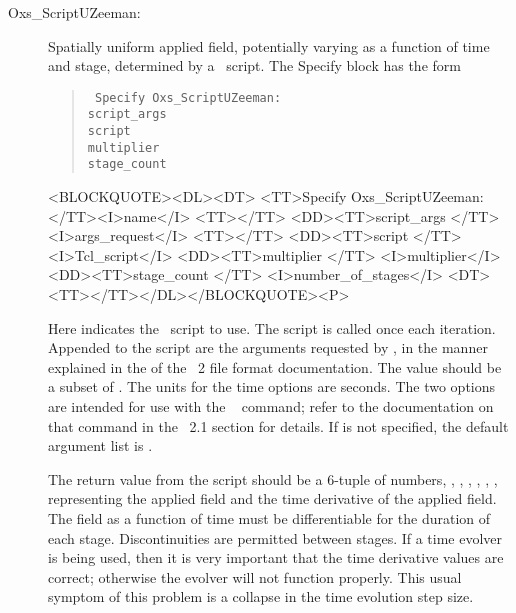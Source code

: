\begin{description}
\item[Oxs\_ScriptUZeeman:]
%
   Spatially uniform applied field,
   potentially varying as a function of time and stage, determined by a
   \Tcl\ script.  The Specify block has the form
      \begin{latexonly}
      \begin{quote}\tt
      Specify Oxs\_ScriptUZeeman: \ocb\\
       \bi script\_args \ocb{}\ccb\\
       \bi script \\
       \bi multiplier \\
       \bi stage\_count  \\
      \ccb
      \end{quote}
      \end{latexonly}
      \begin{rawhtml}
      <BLOCKQUOTE><DL><DT>
      <TT>Specify Oxs_ScriptUZeeman:</TT><I>name</I> <TT>{</TT>
      <DD><TT>script_args {</TT> <I>args_request</I> <TT>}</TT>
      <DD><TT>script </TT> <I>Tcl_script</I>
      <DD><TT>multiplier </TT> <I>multiplier</I>
      <DD><TT>stage_count </TT> <I>number_of_stages</I>
      <DT><TT>}</TT></DL></BLOCKQUOTE><P>
      \end{rawhtml}
   Here  indicates the \Tcl\ script to use.  The script
   is called once each iteration.  Appended to the script are the
   arguments requested by , in the manner
   explained in the 
    of the \MIF~2 file format documentation.  The value
    should be a subset of .
   The units for the time options are seconds.  The two
    options are intended for use with the
   \MIF\  command;
   refer to the documentation on that command in the \MIF~2.1 section
   for details.  If  is not specified, the default
   argument list is .

   The return value from the script should be a 6-tuple of numbers,
   \ocb{}, , , , , \ccb,
   representing the applied field and the time derivative of the applied
   field.  The field as a function of time must be differentiable for
   the duration of each stage.  Discontinuities are permitted between
   stages.  If a time evolver is being used, then it is very important
   that the time derivative values are correct; otherwise the evolver
   will not function properly.  This usual symptom of this problem is a
   collapse in the time evolution step size.


\end{description}
